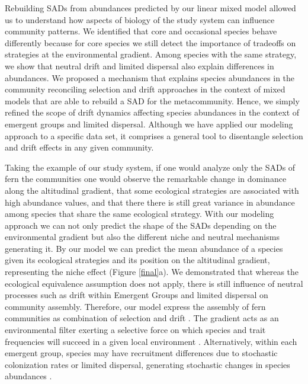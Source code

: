 \documentclass[12pt]{article}
\begin{document}
Rebuilding SADs from abundances predicted by our linear mixed model allowed us to understand how aspects of biology of the study system can influence community patterns. We identified that core and occasional species behave differently because for core species we still detect the importance of tradeoffs on strategies at the environmental gradient. Among species with the same strategy, we show that
neutral drift and limited dispersal also explain differences in abundances. 
We proposed a mechanism that explains species abundances in the community reconciling selection and drift approaches in the context of mixed models that are able to rebuild a SAD for the metacommunity. Hence, we simply refined the scope of drift dynamics affecting species abundances in the context of emergent groups and limited dispersal. Although we have applied our modeling approach to a specific data set, it comprises a general tool to disentangle selection and drift effects in any given community. 

\iffalse
Taking the example of our study system, if one would analyze only the SADs of fern the communities one would observe the remarkable change in dominance along the altitudinal gradient, that some ecological strategies are associated with high abundance values, and that there there is still great variance in abundance among species that
share the same ecological strategy.  
With our modeling approach we can not only predict the shape of the SADs depending on the environmental gradient but also the different niche and neutral mechanisms generating it. By our model we can predict the mean abundance of a species given its ecological strategies and its position on the altitudinal gradient, representing the niche effect (Figure \ref{final}a).
We demonstrated that whereas the
ecological equivalence assumption does not apply, there is still
influence of neutral processes such as drift within Emergent Groups
and limited dispersal on community assembly.
Therefore, our model express the assembly of fern communities as combination of 
selection and drift \citep{Vellend2010}. The gradient acts as an environmental
filter exerting a selective force on which species and trait frequencies will succeed
in a given local environment \citep{Webb2010}. 
Alternatively, within each emergent group,
species may have recruitment differences due to stochastic colonization
rates or limited dispersal, generating stochastic changes in species
abundances \citep{Gravel2006, Weiher2011}.
\end{document}
